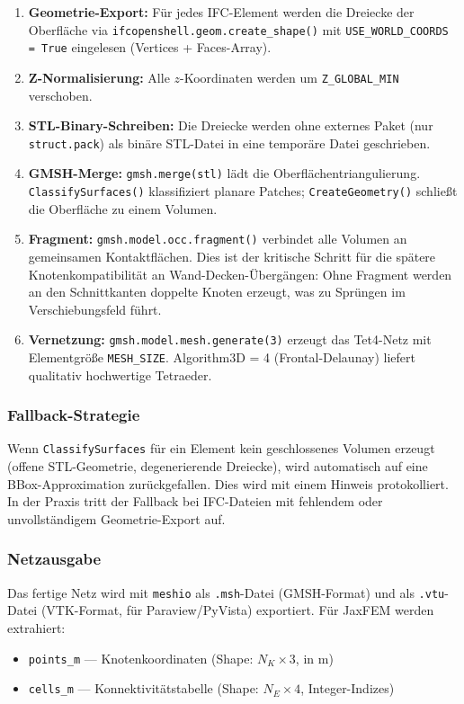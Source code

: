 \documentclass[a4paper,11pt]{article}
\begin{document}
\begin{enumerate}[noitemsep]
  \item \textbf{Geometrie-Export:} Für jedes IFC-Element werden die Dreiecke der Oberfläche via \texttt{ifcopenshell.geom.create\_shape()} mit \texttt{USE\_WORLD\_COORDS = True} eingelesen (Vertices + Faces-Array).
  \item \textbf{Z-Normalisierung:} Alle $z$-Koordinaten werden um \texttt{Z\_GLOBAL\_MIN} verschoben.
  \item \textbf{STL-Binary-Schreiben:} Die Dreiecke werden ohne externes Paket (nur \texttt{struct.pack}) als binäre STL-Datei in eine temporäre Datei geschrieben.
  \item \textbf{GMSH-Merge:} \texttt{gmsh.merge(stl)} lädt die Oberflächentriangulierung. \texttt{ClassifySurfaces()} klassifiziert planare Patches; \texttt{CreateGeometry()} schließt die Oberfläche zu einem Volumen.
  \item \textbf{Fragment:} \texttt{gmsh.model.occ.fragment()} verbindet alle Volumen an gemeinsamen Kontaktflächen. Dies ist der kritische Schritt für die spätere Knotenkompatibilität an Wand-Decken-Übergängen: Ohne Fragment werden an den Schnittkanten doppelte Knoten erzeugt, was zu Sprüngen im Verschiebungsfeld führt.
  \item \textbf{Vernetzung:} \texttt{gmsh.model.mesh.generate(3)} erzeugt das Tet4-Netz mit Elementgröße \texttt{MESH\_SIZE}. Algorithm3D = 4 (Frontal-Delaunay) liefert qualitativ hochwertige Tetraeder.
\end{enumerate}

\subsubsection{Fallback-Strategie}

Wenn \texttt{ClassifySurfaces} für ein Element kein geschlossenes Volumen erzeugt (offene STL-Geometrie, degenerierende Dreiecke), wird automatisch auf eine BBox-Approximation zurückgefallen. Dies wird mit einem Hinweis protokolliert. In der Praxis tritt der Fallback bei IFC-Dateien mit fehlendem oder unvollständigem Geometrie-Export auf.

\subsubsection{Netzausgabe}

Das fertige Netz wird mit \texttt{meshio} als \texttt{.msh}-Datei (GMSH-Format) und als \texttt{.vtu}-Datei (VTK-Format, für Paraview/PyVista) exportiert. Für JaxFEM werden extrahiert:
\begin{itemize}[noitemsep]
  \item \texttt{points\_m} — Knotenkoordinaten (Shape: $N_K \times 3$, in m)
  \item \texttt{cells\_m} — Konnektivitätstabelle (Shape: $N_E \times 4$, Integer-Indizes)
\end{itemize}
\end{document}
